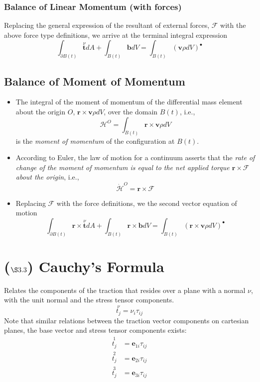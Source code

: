 \documentclass[11pt]{article}
\begin{document}
\subsubsection*{Balance of Linear Momentum (with forces)}
\label{sec:org0e57b0f}
Replacing the general expression of the resultant of external forces, \(\mathcal{F}\) with the above force type definitions, we arrive at the terminal integral expression
$$ \int_{\partial B(t)} \overset{\nu}{\boldsymbol{t}} dA +  \int_{B(t)} \boldsymbol{b} dV =  \int_{B(t)} (\boldsymbol{v} \rho dV)^{\!\bullet} $$
\subsection*{Balance of Moment of Momentum}
\label{sec:orgad50fcc}
\begin{itemize}
\item The integral of the moment of momentum of the differential mass element about the origin \(O\), \(\boldsymbol{r} \times \boldsymbol{v} \rho dV\), over the domain \(B(t)\), i.e.,
$$ \mathcal{H}^O = \int_{B(t)} \boldsymbol{r} \times \boldsymbol{v} \rho dV $$
is the \emph{moment of momentum} of the configuration at \(B(t)\).
\item According to Euler, the law of motion for a continuum asserts that the \emph{rate of change of the moment of momentum is equal to the net applied torque \(\boldsymbol{r} \times \mathcal{F}\) about the origin}, i.e.,
$$ \dot{\mathcal{H}}^O = \boldsymbol{r} \times \mathcal{F} $$
\item Replacing \(\mathcal{F}\) with the force definitions, we the second vector equation of motion
$$ \int_{\partial B(t)} \boldsymbol{r} \times \overset{\nu}{\boldsymbol{t}} dA +  \int_{B(t)} \boldsymbol{r} \times \boldsymbol{b} dV =  \int_{B(t)} (\boldsymbol{r} \times \boldsymbol{v} \rho dV)^{\!\bullet} $$
\end{itemize}
\section*{(\(\S3.3\)) Cauchy's Formula}
\label{sec:org09736e0}
Relates the components of the traction that resides over a plane with a normal \(\nu\), with the unit normal and the stress tensor components.
$$ \overset{\nu}{t_j} = \nu_i \tau_{ij} $$
Note that similar relations between the traction vector components on cartesian planes, the base vector and stress tensor components exists:
\begin{align}
 \overset{1}{t_j} & = \boldsymbol{e}_{1i} \tau_{ij} \\
 \overset{2}{t_j} & = \boldsymbol{e}_{2i} \tau_{ij} \\
 \overset{3}{t_j} & = \boldsymbol{e}_{3i} \tau_{ij} \\
\end{align}
\end{document}
